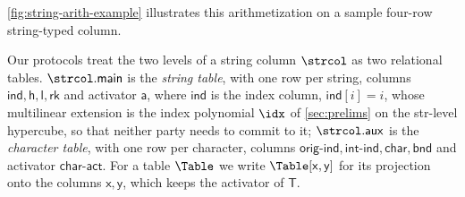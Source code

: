 \cref{fig:string-arith-example} illustrates this arithmetization on a sample four-row string-typed column.

 Our protocols treat the two levels of a string column $\strcol$ as two relational tables. $\strcol.\mathsf{main}$ is the \emph{string table}, with one row per string, columns $\mathsf{ind}, \mathsf{h}, \mathsf{l}, \mathsf{rk}$ and activator $\mathsf{a}$, where $\mathsf{ind}$ is the index column, $\mathsf{ind}[i] = i$, whose multilinear extension is the index polynomial $\idx$ of \cref{sec:prelims} on the str-level hypercube, so that neither party needs to commit to it; $\strcol.\mathsf{aux}$ is the \emph{character table}, with one row per character, columns $\mathsf{orig\text{-}ind}, \mathsf{int\text{-}ind}, \mathsf{char}, \mathsf{bnd}$ and activator $\mathsf{char\text{-}act}$. For a table $\Table$ we write $\Table[\mathsf{x}, \mathsf{y}]$ for its projection onto the columns $\mathsf{x}, \mathsf{y}$, which keeps the activator of $\mathsf{T}$.

